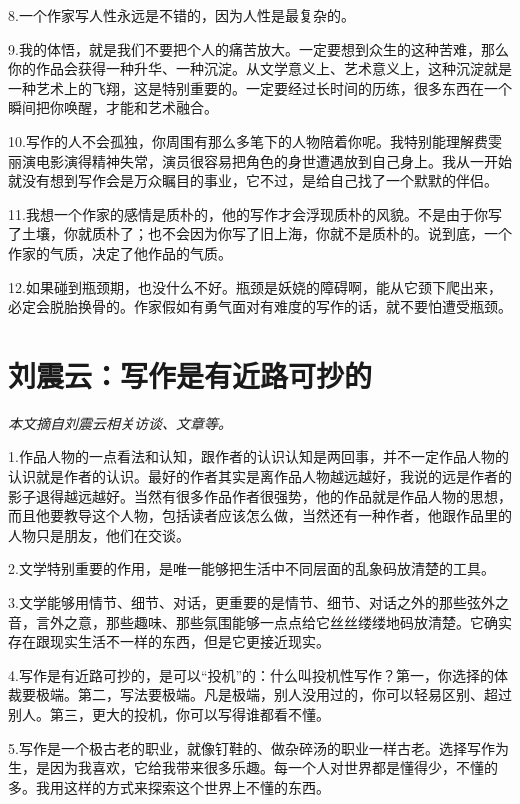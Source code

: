 \documentclass[fontset=fandol,12pt,a5paper]{ctexbook}
\begin{document}
8.一个作家写人性永远是不错的，因为人性是最复杂的。

9.我的体悟，就是我们不要把个人的痛苦放大。一定要想到众生的这种苦难，那么你的作品会获得一种升华、一种沉淀。从文学意义上、艺术意义上，这种沉淀就是一种艺术上的飞翔，这是特别重要的。一定要经过长时间的历练，很多东西在一个瞬间把你唤醒，才能和艺术融合。

10.写作的人不会孤独，你周围有那么多笔下的人物陪着你呢。我特别能理解费雯丽演电影演得精神失常，演员很容易把角色的身世遭遇放到自己身上。我从一开始就没有想到写作会是万众瞩目的事业，它不过，是给自己找了一个默默的伴侣。

11.我想一个作家的感情是质朴的，他的写作才会浮现质朴的风貌。不是由于你写了土壤，你就质朴了；也不会因为你写了旧上海，你就不是质朴的。说到底，一个作家的气质，决定了他作品的气质。

12.如果碰到瓶颈期，也没什么不好。瓶颈是妖娆的障碍啊，能从它颈下爬出来，必定会脱胎换骨的。作家假如有勇气面对有难度的写作的话，就不要怕遭受瓶颈。

\newpage

\section{刘震云：写作是有近路可抄的}

\emph{本文摘自刘震云相关访谈、文章等。}
\vspace{2em}

1.作品人物的一点看法和认知，跟作者的认识认知是两回事，并不一定作品人物的认识就是作者的认识。最好的作者其实是离作品人物越远越好，我说的远是作者的影子退得越远越好。当然有很多作品作者很强势，他的作品就是作品人物的思想，而且他要教导这个人物，包括读者应该怎么做，当然还有一种作者，他跟作品里的人物只是朋友，他们在交谈。

2.文学特别重要的作用，是唯一能够把生活中不同层面的乱象码放清楚的工具。

3.文学能够用情节、细节、对话，更重要的是情节、细节、对话之外的那些弦外之音，言外之意，那些趣味、那些氛围能够一点点给它丝丝缕缕地码放清楚。它确实存在跟现实生活不一样的东西，但是它更接近现实。

4.写作是有近路可抄的，是可以“投机”的：什么叫投机性写作？第一，你选择的体裁要极端。第二，写法要极端。凡是极端，别人没用过的，你可以轻易区别、超过别人。第三，更大的投机，你可以写得谁都看不懂。

5.写作是一个极古老的职业，就像钉鞋的、做杂碎汤的职业一样古老。选择写作为生，是因为我喜欢，它给我带来很多乐趣。每一个人对世界都是懂得少，不懂的多。我用这样的方式来探索这个世界上不懂的东西。
\end{document}
